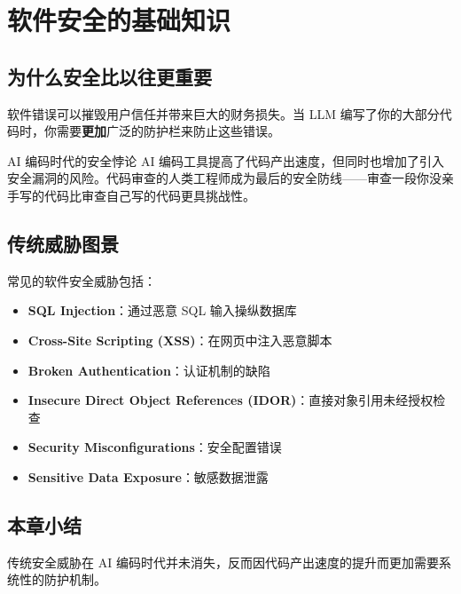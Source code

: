 \section{软件安全的基础知识}

\subsection{为什么安全比以往更重要}

软件错误可以摧毁用户信任并带来巨大的财务损失。当 LLM 编写了你的大部分代码时，你需要\textbf{更加}广泛的防护栏来防止这些错误。

\begin{importantbox}{AI 编码时代的安全悖论}
AI 编码工具提高了代码产出速度，但同时也增加了引入安全漏洞的风险。代码审查的人类工程师成为最后的安全防线——审查一段你没亲手写的代码比审查自己写的代码更具挑战性。
\end{importantbox}

\subsection{传统威胁图景}

常见的软件安全威胁包括：
\begin{itemize}
    \item \textbf{SQL Injection}：通过恶意 SQL 输入操纵数据库
    \item \textbf{Cross-Site Scripting (XSS)}：在网页中注入恶意脚本
    \item \textbf{Broken Authentication}：认证机制的缺陷
    \item \textbf{Insecure Direct Object References (IDOR)}：直接对象引用未经授权检查
    \item \textbf{Security Misconfigurations}：安全配置错误
    \item \textbf{Sensitive Data Exposure}：敏感数据泄露
\end{itemize}

\subsection{本章小结}

传统安全威胁在 AI 编码时代并未消失，反而因代码产出速度的提升而更加需要系统性的防护机制。

